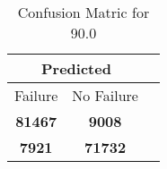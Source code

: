 \begin{table}[] 
\caption{Confusion Matric for 90.0} 
\label{Table: Prediction Accuracy-DMD90.0OnlySunEKF-ignoreReflection-Reflection} 
\centering 
\begin{tabular} 
 {@{}ccc@{}} 
\toprule 
\multicolumn{2}{c}{\textbf{Predicted}}
 \\ \midrule 
\multicolumn{1}{|c|}{Failure} & 
\multicolumn{1}{c|}{No Failure}
 \\ \midrule 
\multicolumn{1}{|c|}{\color{green}\textbf{81467}} & 
\multicolumn{1}{c|}{\color{red}\textbf{9008}}
 \\ \midrule 
\multicolumn{1}{|c|}{\color{red}\textbf{7921}} & 
\multicolumn{1}{c|}{\color{green}\textbf{71732}}
 \\ \bottomrule 
\end{tabular} 
\end{table} 
